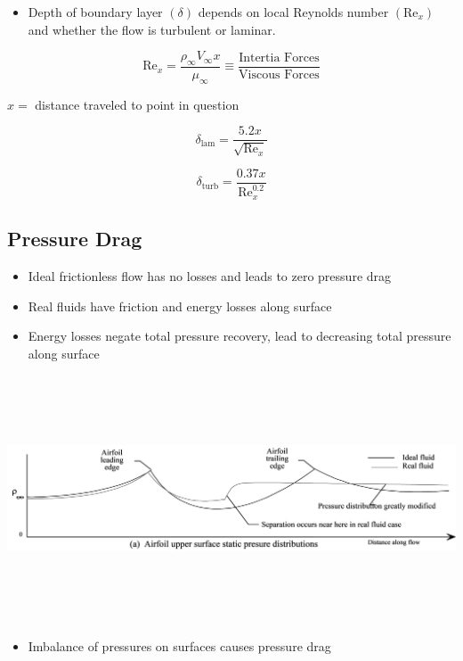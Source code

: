 \documentclass[
]{book}
\providecommand{\tightlist}{%
  \setlength{\itemsep}{0pt}\setlength{\parskip}{0pt}}
\begin{document}
\begin{itemize}
\tightlist
\item
  Depth of boundary layer \((\delta)\) depends on local Reynolds number \((\mathrm{Re}_x)\) and whether the flow is turbulent or laminar.
\end{itemize}

\[\mathrm{Re}_x = \frac{\rho_{\infty} V_{\infty} x}{\mu_{\infty}} \equiv \frac{\text{Intertia Forces}}{\text{Viscous Forces}} \]

\(x =\) distance traveled to point in question

\[\delta_{\mathrm{lam}} = \frac{5.2x}{\sqrt{\mathrm{Re}_x}} \]

\[\delta_{\mathrm{turb}} = \frac{0.37x}{\mathrm{Re}_x^{0.2}} \]

\hypertarget{pressure-drag}{%
\subsection{Pressure Drag}\label{pressure-drag}}

\begin{itemize}
\tightlist
\item
  Ideal frictionless flow has no losses and leads to zero pressure drag
\item
  Real fluids have friction and energy losses along surface
\item
  Energy losses negate total pressure recovery, lead to decreasing total pressure along surface
\end{itemize}

\includegraphics[width=8.8in,height=2.875in]{media/05/image46.svg}

\begin{itemize}
\tightlist
\item
  Imbalance of pressures on surfaces causes pressure drag
\end{itemize}
\end{document}
